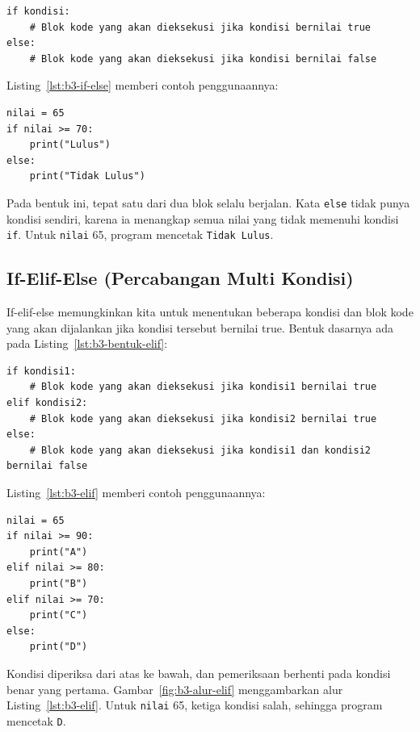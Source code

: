 \begin{lstlisting}[style=PythonStyle, caption={Bentuk dasar if-else}, label={lst:b3-bentuk-if-else}]
if kondisi:
    # Blok kode yang akan dieksekusi jika kondisi bernilai true
else:
    # Blok kode yang akan dieksekusi jika kondisi bernilai false
\end{lstlisting}

Listing~\ref{lst:b3-if-else} memberi contoh penggunaannya:

\begin{lstlisting}[style=PythonStyle, caption={Kode Python: if_else_statement.py}, label={lst:b3-if-else}]
nilai = 65
if nilai >= 70:
    print("Lulus")
else:
    print("Tidak Lulus")
\end{lstlisting}

Pada bentuk ini, tepat satu dari dua blok selalu berjalan. Kata \texttt{else} tidak punya kondisi sendiri, karena ia menangkap semua nilai yang tidak memenuhi kondisi \texttt{if}. Untuk \texttt{nilai} 65, program mencetak \texttt{Tidak Lulus}.

\subsection{If-Elif-Else (Percabangan Multi Kondisi)}
If-elif-else memungkinkan kita untuk menentukan beberapa kondisi dan blok kode yang akan dijalankan jika kondisi tersebut bernilai true. Bentuk dasarnya ada pada Listing~\ref{lst:b3-bentuk-elif}:

\begin{lstlisting}[style=PythonStyle, caption={Bentuk dasar if-elif-else}, label={lst:b3-bentuk-elif}]
if kondisi1:
    # Blok kode yang akan dieksekusi jika kondisi1 bernilai true
elif kondisi2:
    # Blok kode yang akan dieksekusi jika kondisi2 bernilai true
else:
    # Blok kode yang akan dieksekusi jika kondisi1 dan kondisi2 bernilai false
\end{lstlisting}

Listing~\ref{lst:b3-elif} memberi contoh penggunaannya:

\begin{lstlisting}[style=PythonStyle, caption={Kode Python: if_elif_else_statement.py}, label={lst:b3-elif}]
nilai = 65
if nilai >= 90:
    print("A")
elif nilai >= 80:
    print("B")
elif nilai >= 70:
    print("C")
else:
    print("D")
\end{lstlisting}

Kondisi diperiksa dari atas ke bawah, dan pemeriksaan berhenti pada kondisi benar yang pertama. Gambar~\ref{fig:b3-alur-elif} menggambarkan alur Listing~\ref{lst:b3-elif}. Untuk \texttt{nilai} 65, ketiga kondisi salah, sehingga program mencetak \texttt{D}.

